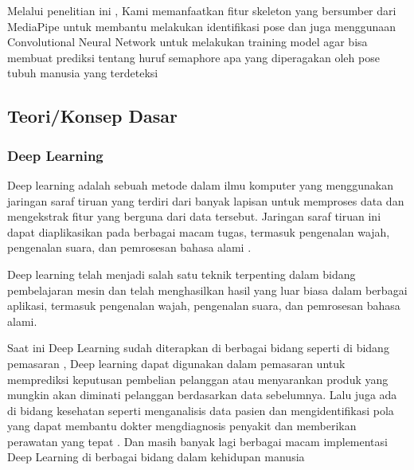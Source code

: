 Melalui penelitian ini , Kami memanfaatkan fitur skeleton yang bersumber dari MediaPipe untuk membantu melakukan identifikasi pose dan juga menggunaan Convolutional Neural Network untuk melakukan training model agar bisa membuat prediksi tentang huruf semaphore apa yang diperagakan oleh pose tubuh manusia yang terdeteksi

\subsection{Teori/Konsep Dasar}

\subsubsection{Deep Learning}

Deep learning adalah sebuah metode dalam ilmu komputer yang menggunakan jaringan saraf tiruan yang terdiri dari banyak lapisan untuk memproses data dan mengekstrak fitur yang berguna dari data tersebut. Jaringan saraf tiruan ini dapat diaplikasikan pada berbagai macam tugas, termasuk pengenalan wajah, pengenalan suara, dan pemrosesan bahasa alami \parencite{DeepLearning2015}.

Deep learning telah menjadi salah satu teknik terpenting dalam bidang pembelajaran mesin dan telah menghasilkan hasil yang luar biasa dalam berbagai aplikasi, termasuk pengenalan wajah, pengenalan suara, dan pemrosesan bahasa alami.
\parencite{DeepLearningDef}

Saat ini Deep Learning sudah diterapkan di berbagai bidang seperti di bidang pemasaran , Deep learning dapat digunakan dalam pemasaran untuk memprediksi keputusan pembelian pelanggan atau menyarankan produk yang mungkin akan diminati pelanggan berdasarkan data sebelumnya. Lalu juga ada di bidang kesehatan seperti  menganalisis data pasien dan mengidentifikasi pola yang dapat membantu dokter mengdiagnosis penyakit dan memberikan perawatan yang tepat . Dan masih banyak lagi berbagai macam implementasi Deep Learning di berbagai bidang dalam kehidupan manusia 

